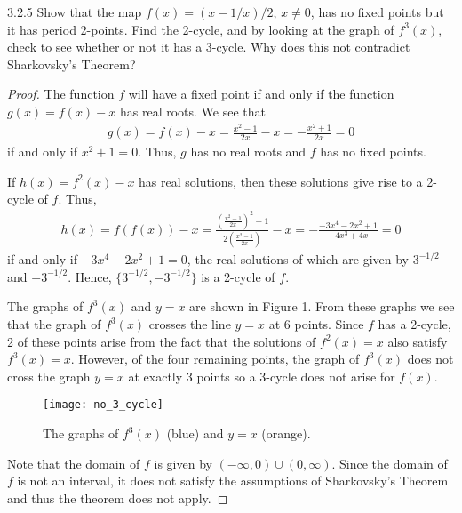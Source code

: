 \begin{problem}{3.2.5}
  Show that the map $f(x) = (x - 1/x)/2$, $x \neq 0$, has no fixed points but it has
  period 2-points. Find the 2-cycle, and by looking at the graph of $f^3 (x)$, check to see
  whether or not it has a 3-cycle. Why does this not contradict Sharkovsky’s Theorem?
\end{problem}

\begin{proof}The function $f$ will have a fixed point if and only if the function $g(x) = f(x) - x$
  has real roots. We see that
  \begin{align*}
    g(x) = f(x) - x = \frac{x^2-1}{2x} - x = -\frac{x^2+1}{2x} = 0
  \end{align*}
  if and only if $x^2 + 1 =0$. Thus, $g$ has no real roots and $f$ has no fixed points.

  If $h(x) = f^2(x) - x$ has real solutions, then these solutions give rise to a 2-cycle of $f$.
  Thus,
  \begin{align*}
    h(x) = f(f(x)) - x = \frac{\left(\frac{x^2-1}{2x}\right)^2-1}{2\left(\frac{x^2-1}{2x}\right)} - x
    = -\frac{- 3 x^4 - 2 x^2 + 1}{-4x^3 + 4 x}= 0
  \end{align*}
  if and only if $- 3 x^4 - 2 x^2 + 1=0$, the real solutions of which are given by $3^{-1/2}$ and $-3^{-1/2}$.
  Hence, $\{3^{-1/2}, -3^{-1/2}\}$ is a 2-cycle of $f$.

  The graphs of $f^3(x)$ and $y=x$ are shown in Figure 1. From these graphs we see that
  the graph of $f^3(x)$ crosses the line $y=x$ at 6 points. Since $f$ has a 2-cycle, 2 of these points
  arise from the fact that the solutions of $f^2(x) = x$ also satisfy $f^3(x) = x$. However, of the four remaining
  points, the graph of $f^3(x)$ does not cross the graph $y=x$ at exactly 3 points so a 3-cycle does not arise for $f(x)$.

  \begin{figure}[!h]
    \centerline{\texttt{[image: no\_3\_cycle]}}
    \caption{The graphs of $f^3(x)$ (blue) and $y=x$ (orange).}
  \end{figure}


  Note that the domain of $f$ is given by $(-\infty, 0) \cup (0, \infty)$. Since the domain of $f$ is
  not an interval, it does not satisfy the assumptions of Sharkovsky's Theorem
  and thus the theorem does not apply.

\end{proof}
\newpage
